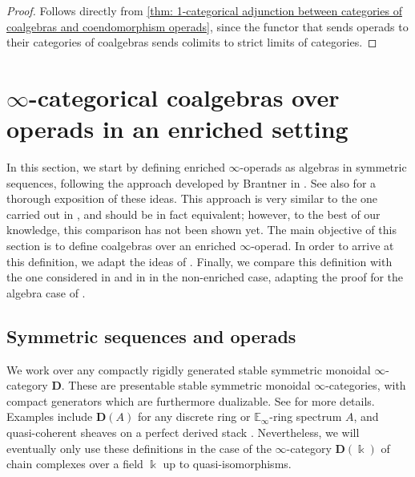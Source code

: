 \documentclass[a4paper,12pt]{amsart}
\theoremstyle{plain}
\theoremstyle{definition}
\theoremstyle{remark}
\newcommand{\kk}{\Bbbk}
\begin{document}
\begin{proof}
Follows directly from \cref{thm: 1-categorical adjunction between categories of coalgebras and coendomorphism operads}, since the functor that sends operads to their categories of coalgebras sends colimits to strict limits of categories.
\end{proof}

\vspace{1pc}

\section{\texorpdfstring{$\infty$}{Infinity}-categorical coalgebras over operads in an enriched setting}

\vspace{2.5pc}

In this section, we start by defining enriched $\infty$-operads as algebras in symmetric sequences, following the approach developed by Brantner in \cite[Section 4.1.2]{BrantnerPhD}. See also \cite[Section 5.2.4]{ShiPhD} for a thorough exposition of these ideas. This approach is very similar to the one carried out in \cite{Haugseng}, and should be in fact equivalent; however, to the best of our knowledge, this comparison has not been shown yet. The main objective of this section is to define coalgebras over an enriched $\infty$-operad. In order to arrive at this definition, we adapt the ideas of \cite[Appendix A]{heuts2024}. Finally, we compare this definition with the one considered in \cite{ellipticI} and in \cite{peroux} in the non-enriched case, adapting the proof for the algebra case of \cite[Appendix A.2.]{ShiPhD}. 


\subsection{Symmetric sequences and operads}
We work over any compactly rigidly generated stable symmetric monoidal $\infty$-category $\mathbf{D}$. These are presentable stable symmetric monoidal $\infty$-categories, with compact generators which are furthermore dualizable. See \cite{ramzi2024locallyrigidinftycategories} for more details. Examples include $\mathbf{D}(A)$ for any discrete ring or $\mathbb{E}_\infty$-ring spectrum $A$, and quasi-coherent sheaves on a perfect derived stack \cite[Proposition 3.9]{bfn}. Nevertheless, we will eventually only use these definitions in the case of the $\infty$-category $\mathbf{D}(\kk)$ of chain complexes over a field $\kk$ up to quasi-isomorphisms. 
\end{document}
